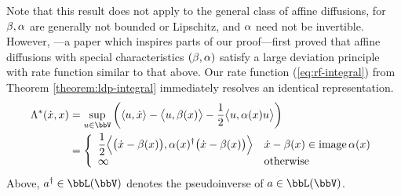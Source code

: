 \begin{example}[Diffusions]
  Note that this result does not apply to the general class of affine diffusions, for $\beta, \alpha$ are generally not bounded or Lipschitz, and $\alpha$ need not be invertible.
  However, \cite{kang2014}---a paper which inspires parts of our proof---first proved that affine diffusions with special characteristics $(\beta, \alpha)$ satisfy a large deviation principle with rate function similar to that above.
  Our rate function (\ref{eq:rf-integral}) from Theorem \ref{theorem:ldp-integral} immediately resolves an identical representation.
  \begin{align*}
    \ode^*(\dot\stateVar, \stateVar)
    &= \sup_{\momentVar \in \vecSpace} \bigg( \prj{\momentVar}{\dot\stateVar} - \bprj{\momentVar}{\affDrift(\stateVar)} - \frac12\bprj{\momentVar}{\affDiff(\stateVar)\momentVar} \bigg) \\
    &= \left\{\begin{array}{ll}
      \displaystyle \frac12\Bprj{\big(\dot\stateVar-\affDrift(\stateVar)\big)}{\affDiff(\stateVar)^\dagger\big(\dot\stateVar-\affDrift(\stateVar)\big)} & \dot\stateVar - \affDrift(\stateVar) \in \operatorname{image}\affDiff(\stateVar) \\
      \infty & \text{otherwise}
    \end{array}\right.
  \end{align*}
  Above, $a^\dagger \in \bbL(\vecSpace)$ denotes the pseudoinverse of $a \in \bbL(\vecSpace)$.
\end{example}
